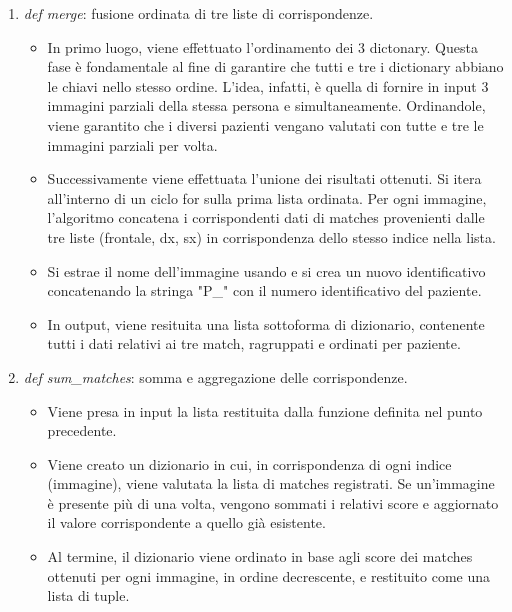\documentclass[12pt,a4paper,openright,twoside]{book}
\begin{document}
\begin{enumerate}
\item {\itshape def merge}: fusione ordinata di tre liste di corrispondenze.
\begin{itemize}
\item In primo luogo, viene effettuato l'ordinamento dei 3 dictonary. Questa fase è fondamentale al fine di garantire che tutti e tre i dictionary abbiano le chiavi nello stesso ordine. L'idea, infatti, è quella di fornire in input 3 immagini parziali della stessa persona e simultaneamente. Ordinandole, viene garantito che i diversi pazienti vengano valutati con tutte e tre le immagini parziali per volta.
\item Successivamente viene effettuata l'unione dei risultati ottenuti. Si itera all'interno di un ciclo for sulla prima lista ordinata. Per ogni immagine, l'algoritmo concatena i corrispondenti dati di matches provenienti dalle tre liste (frontale, dx, sx) in corrispondenza dello stesso indice nella lista.
\item Si estrae il nome dell'immagine usando e si crea un nuovo identificativo concatenando la stringa "P\_" con il numero identificativo del paziente.
\item In output, viene resituita una lista sottoforma di dizionario, contenente tutti i dati relativi ai tre match, ragruppati e ordinati per paziente. 
\end{itemize}

\item {\itshape def sum\_matches}: somma e aggregazione delle corrispondenze.
\begin{itemize}

\begin{figure}[H]
	\centering
    	
\end{figure} 

\item Viene presa in input la lista restituita dalla funzione definita nel punto precedente.
\item Viene creato un dizionario in cui, in corrispondenza di ogni indice (immagine), viene valutata la lista di matches registrati. Se un'immagine è presente più di una volta, vengono sommati i relativi score e aggiornato il valore corrispondente a quello già esistente.
\item Al termine, il dizionario viene ordinato in base agli score dei matches ottenuti per ogni immagine, in ordine decrescente, e restituito come una lista di tuple.
\end{itemize}


\end{enumerate}
\end{document}
